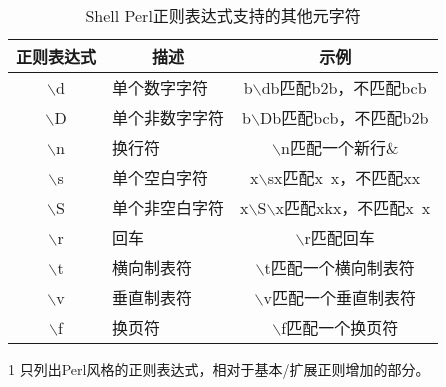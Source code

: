 \begin{table}[htbp]
	\renewcommand{\arraystretch}{1.5}
	\newcommand{\tc}[1]{\multicolumn{1}{c}{#1}}
	\newcommand{\tl}[1]{\multicolumn{1}{l}{#1}}
	\newcommand{\tr}[1]{\multicolumn{1}{r}{#1}}
	\centering
	\caption[extmetachar]{Shell Perl正则表达式支持的其他元字符}
	\vspace{0.8em}\centering\wuhao
	\begin{threeparttable}
		\begin{tabular}{clc}
			\toprule[2pt]
			\textbf{正则表达式} & \tc{\textbf{描述}} & \textbf{示例}\\[2pt]
			\midrule[0.8pt]
			$\backslash$d & 单个数字字符 & b$\backslash$db匹配b2b，不匹配bcb\\[8pt]
			$\backslash$D & 单个非数字字符 & b$\backslash$Db匹配bcb，不匹配b2b\\[8pt]
			$\backslash$n & 换行符 & $\backslash$n匹配一个新行\&\\[8pt]
			$\backslash$s & 单个空白字符 & x$\backslash$sx匹配x\ x，不匹配xx\\[8pt]
			$\backslash$S & 单个非空白字符 & x$\backslash$S$\backslash$x匹配xkx，不匹配x\ x\\[8pt]
			$\backslash$r & 回车 & $\backslash$r匹配回车\\[8pt]
			$\backslash$t & 横向制表符 & $\backslash$t匹配一个横向制表符\\[8pt]
			$\backslash$v & 垂直制表符 & $\backslash$v匹配一个垂直制表符\\[8pt]
			$\backslash$f & 换页符 & $\backslash$f匹配一个换页符\\[8pt]
			\bottomrule[2pt]
		\end{tabular}

		\begin{tablenotes}
			\footnotesize
			\item[1] 只列出Perl风格的正则表达式，相对于基本/扩展正则增加的部分。
		\end{tablenotes}
	\end{threeparttable}
\end{table}
